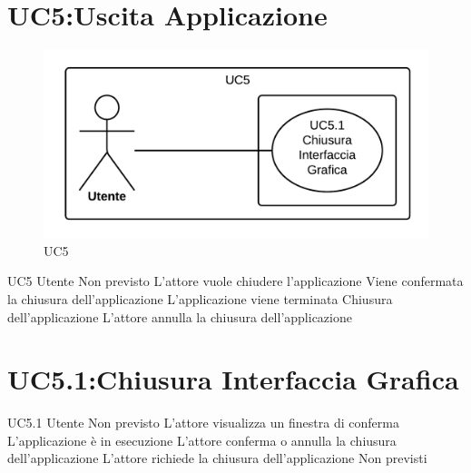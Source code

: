 \documentclass[../AnalisideiRequisiti.tex]{subfiles}
\begin{document}
\section{UC5:Uscita Applicazione}
\begin{figure}[H]
	\caption{UC5}
	\centering
	\includegraphics[width=\textwidth]{../img/UC05.png}
\end{figure}
\UserCase
{UC5}
{Utente}
{Non previsto}
{L'attore vuole chiudere l'applicazione}
{Viene confermata la chiusura dell'applicazione }
{L'applicazione viene terminata}
{Chiusura dell'applicazione}
{L'attore annulla la chiusura dell'applicazione }

\section{UC5.1:Chiusura Interfaccia Grafica}
\UserCase
{UC5.1}
{Utente}
{Non previsto}
{L'attore visualizza un finestra di conferma}
{L'applicazione è in esecuzione}
{L'attore conferma o annulla la chiusura dell'applicazione}
{L'attore richiede la chiusura dell'applicazione}
{Non previsti}
\end{document}
